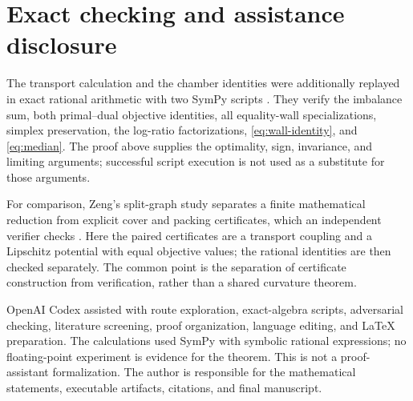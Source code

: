 \documentclass[11pt]{article}
\theoremstyle{remark}
\begin{document}
\section{Exact checking and assistance disclosure}

The transport calculation and the chamber identities were additionally
replayed in exact rational arithmetic with two SymPy scripts
\cite{10.7717/peerj-cs.103}.  They verify
the imbalance sum, both primal--dual objective identities, all equality-wall
specializations, simplex preservation, the log-ratio factorizations,
\eqref{eq:wall-identity}, and \eqref{eq:median}.  The proof above supplies the
optimality, sign, invariance, and limiting arguments; successful script
execution is not used as a substitute for those arguments.

For comparison, Zeng's split-graph study separates a finite mathematical
reduction from explicit cover and packing certificates, which an independent
verifier checks \cite{ZengTuza2026}.  Here the paired certificates are a
transport coupling and a Lipschitz potential with equal objective values;
the rational identities are then checked separately.  The common point is
the separation of certificate construction from verification, rather than a
shared curvature theorem.

OpenAI Codex assisted with route exploration, exact-algebra scripts,
adversarial checking, literature screening, proof organization, language
editing, and LaTeX preparation.  The calculations used SymPy with symbolic
rational expressions; no floating-point experiment is evidence for the
theorem.  This is not a proof-assistant formalization.  The author is
responsible for the mathematical statements, executable artifacts,
citations, and final manuscript.



\end{document}
